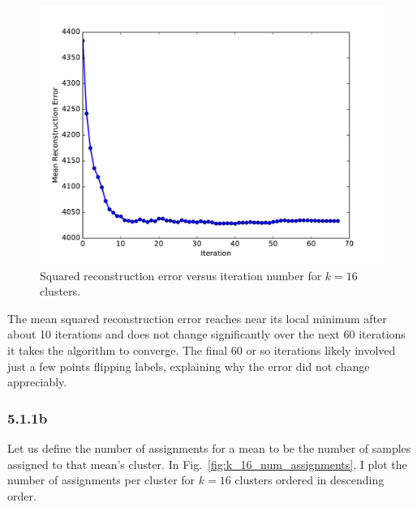 \documentclass[12pt]{amsart}
\begin{document}
\begin{figure}[H]
	\includegraphics[width=\columnwidth]{k_16_rec_err.pdf}
    \caption{Squared reconstruction error versus iteration number for $k = 16$ clusters.}
    \label{fig:k_16_rec_err}
\end{figure}

The mean squared reconstruction error reaches near its local minimum after about 10 iterations and does not change significantly over the next 60 iterations it takes the algorithm to converge.  The final 60 or so iterations likely involved just a few points flipping labels, explaining why the error did not change appreciably.

\subsubsection*{5.1.1b}

Let us define the number of assignments for a mean to be the number of samples assigned to that mean's cluster.  In Fig.~\ref{fig:k_16_num_assignments}, I plot the number of assignments per cluster for $k = 16$ clusters ordered in descending order.
\end{document}
